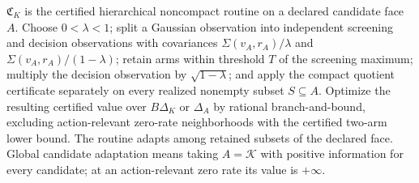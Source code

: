 \(\mathfrak C_K\) is the certified hierarchical noncompact routine on a declared candidate face \(A\).  Choose \(0<\lambda<1\); split a Gaussian observation into independent screening and decision observations with covariances \(\Sigma(v_A,r_A)/\lambda\) and \(\Sigma(v_A,r_A)/(1-\lambda)\); retain arms within threshold \(T\) of the screening maximum; multiply the decision observation by \(\sqrt{1-\lambda}\); and apply the compact quotient certificate separately on every realized nonempty subset \(S\subseteq A\).  Optimize the resulting certified value over \(B\Delta_K\) or \(\Delta_A\) by rational branch-and-bound, excluding action-relevant zero-rate neighborhoods with the certified two-arm lower bound.  The routine adapts among retained subsets of the declared face.  Global candidate adaptation means taking \(A=\mathcal K\) with positive information for every candidate; at an action-relevant zero rate its value is \(+\infty\).